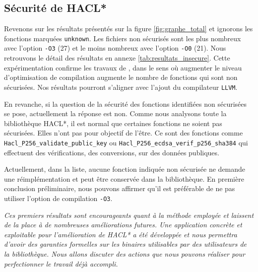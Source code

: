 \subsection*{Sécurité de HACL*}

Revenons sur les résultats présentés sur la figure \ref{fig:graphe_total} et ignorons les fonctions marquées \texttt{unknown}. Les fichiers non sécurisés sont les plus nombreux avec l'option \texttt{-O3} (27) et le moins nombreux avec l'option \texttt{-O0} (21). Nous retrouvons le détail des résultats en annexe \ref{tab:resultats_insecure}. Cette expérimentation confirme les travaux de \citeauthor{schneider2024breakingbadcompilersbreak}, dans le sens où augmenter le niveau d'optimisation de compilation augmente le nombre de fonctions qui sont non sécurisées. Nos résultats pourront s'aligner avec l'ajout du compilateur \texttt{LLVM}.\smallbreak 

En revanche, si la question de la sécurité des fonctions identifiées non sécurisées se pose, actuellement la réponse est non. Comme nous analysons toute la bibliothèque HACL*, il est normal que certaines fonctions ne soient pas sécurisées. Elles n'ont pas pour objectif de l'être. Ce sont des fonctions comme \texttt{Hacl\_P256\_\-vali\-date\_public\_key} ou \texttt{Hacl\_P256\_\-ecdsa\_\-verif\_p256\_sha384} qui effectuent des vérifications, des conversions, sur des données publiques. 

Actuellement, dans la liste, aucune fonction indiquée non sécurisée ne demande une réimplémentation et peut être conservée dans la bibliothèque. En première conclusion préliminaire, nous pouvons affirmer qu'il est préférable de ne pas utiliser l'option de compilation \texttt{-O3}.


\vfill
\textit{Ces premiers résultats sont encourageants quant à la méthode employée et laissent de la place à de nombreuses améliorations futures. Une application concrète et exploitable pour l'amélioration de HACL* a été développée et nous permettra d'avoir des garanties formelles sur les binaires utilisables par des utilisateurs de la bibliothèque. Nous allons discuter des actions que nous pouvons réaliser pour perfectionner le travail déjà accompli.}